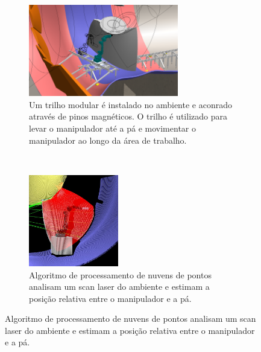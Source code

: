 \begin{figure}[H]
\ContinuedFloat
\begin{subfigure}{0.5\linewidth}
\includegraphics[width=0.9\linewidth, height=4cm]{figs/EMMA_Base_Secundaria_01} 
\caption{Um trilho modular é instalado no ambiente e aconrado através de pinos
magnéticos. O trilho é utilizado para levar o manipulador até a pá e movimentar
o manipulador ao longo da área de trabalho.}
\end{subfigure}
~
\begin{subfigure}{0.5\linewidth}
\label{fig:subim2}
\includegraphics[width=0.9\linewidth, height=4cm]{figs/localizacao}
\caption{Algoritmo de processamento de nuvens de pontos analisam um scan laser
do ambiente e estimam a posição relativa entre o manipulador e a pá.}
\end{subfigure}
 \label{fig:image2}
\end{figure}



% 









